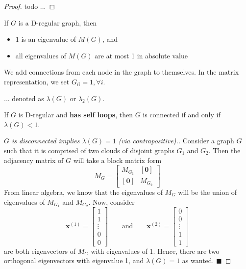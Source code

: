 \documentclass[11pt, letter]{book}
\newcommand{\bx}{\mathbf{x}}
\newcommand{\bzero}{\mathbf{0}}
\newcommand{\qed}{\hfill $\blacksquare$}
\begin{document}
\begin{proof}
	todo ... 
\end{proof}

\begin{proposition}
	If $G$ is a D-regular graph, then
	\begin{itemize}
		\item 1 is an eigenvalue of $M(G)$, and 
		\item all eigenvalues of $M(G)$ are at most 1 in absolute value
	\end{itemize}
\end{proposition}

\begin{definition}
	We add connections from each node in the graph to themselves. In the matrix representation, we set $G_{ii} = 1, \forall i$. 
\end{definition}

\begin{definition}
	... denoted as $\lambda(G)$ or $\lambda_2(G)$. 
\end{definition}

\begin{lemma}
	If $G$ is D-regular and \textbf{has self loops}, then $G$ is connected if and only if $\lambda(G) < 1$.
\end{lemma}

\begin{proof} 
[$G$ is disconnected implies $\lambda(G) = 1$ (via contrapositive).] 
Consider a graph $G$ such that it is comprised of two clouds of disjoint graphs $G_1$ and $G_2$. Then the adjacency matrix of $G$ will take a block matrix form
\begin{equation}
	M_G = \begin{bmatrix}
		M_{G_1} & [\bzero ]  \\
		[\bzero ] & M_{G_2}
	\end{bmatrix}
\end{equation}
From linear algebra, we know that the eigenvalues of $M_G$ will be the union of eigenvalues of $M_{G_1}$ and $M_{G_2}$. Now, consider
\begin{equation}
	\bx^{(1)} = 
	\begin{bmatrix}
		1 \\ 1 \\ \vdots \\ 0 \\ 0
	\end{bmatrix} 
	\quad \quad \text{and} \quad \quad
	\bx^{(2)} = 
	\begin{bmatrix}
		0 \\ 0 \\ \vdots \\ 1 \\ 1
	\end{bmatrix}
\end{equation}
are both eigenvectors of $M_G$ with eigenvalues of 1. Hence, there are two orthogonal eigenvectors with eigenvalue 1, and $\lambda(G) = 1$ as wanted. 
\qed

\end{proof}
\end{document}
